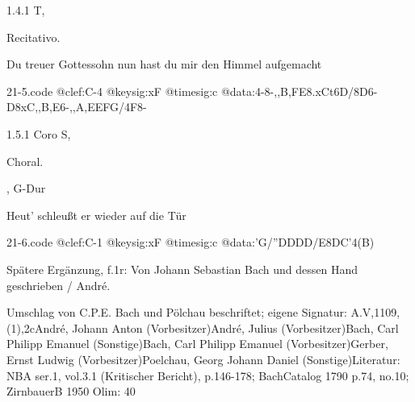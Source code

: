 \documentclass[a4paper, twocolumn, 11pt]{book}
\begin{document}
\newline %
\par 1.4.1  T, \begin{itshape}Recitativo.\end{itshape}\newline \begin{footnotesize} Du treuer Gottessohn nun hast du mir den Himmel aufgemacht \end{footnotesize}  
\begin{filecontents*}{21-5.code}
@clef:C-4
@keysig:xF
@timesig:c
@data:4-8-,,B,FE8.xCt6D/8D6-D8xC,,B,E6-,,A,EEFG/4F8-
\end{filecontents*}
\newline %
\par 1.5.1  Coro S, \begin{itshape}Choral.\end{itshape}, G-Dur\newline \begin{footnotesize} Heut' schleußt er wieder auf die Tür \end{footnotesize}  
\begin{filecontents*}{21-6.code}
@clef:C-1
@keysig:xF
@timesig:c
@data:'G/''DDDD/E{8DC}'4(B)
\end{filecontents*}
\newline %
\par Spätere Ergänzung, f.1r: {\textquotedbl}Von Johann Sebastian Bach und dessen Hand geschrieben / André.{\textquotedbl}
\par Umschlag von C.P.E. Bach und Pölchau beschriftet; eigene Signatur: A.V,1109,(1),2c\newline André, Johann Anton  (Vorbesitzer)\newline André, Julius  (Vorbesitzer)\newline Bach, Carl Philipp Emanuel  (Sonstige)\newline Bach, Carl Philipp Emanuel  (Vorbesitzer)\newline Gerber, Ernst Ludwig  (Vorbesitzer)\newline Poelchau, Georg Johann Daniel  (Sonstige)\newline Literatur: NBA  ser.1, vol.3.1 (Kritischer Bericht), p.146-178; BachCatalog 1790  p.74, no.10; ZirnbauerB 1950  \newline Olim: 40
\end{document}

